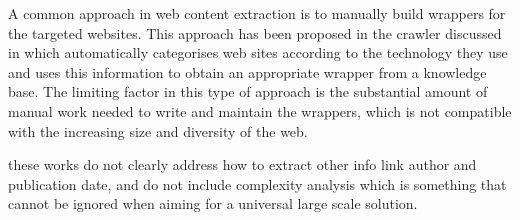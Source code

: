 A common approach in web content extraction is to manually build wrappers for the targeted websites. This approach has been proposed in the crawler discussed in \cite{faheem2012intelligent} which automatically categorises web sites according to the technology they use and uses this information to obtain an appropriate wrapper from a knowledge base. The limiting factor in this type of approach is the substantial amount of manual work needed to write and maintain the wrappers, which is not compatible with the increasing size and diversity of the web.


these works do not clearly address how to extract other info link author and publication date, and do not include complexity analysis which is something that cannot be ignored when aiming for a universal large scale solution.

